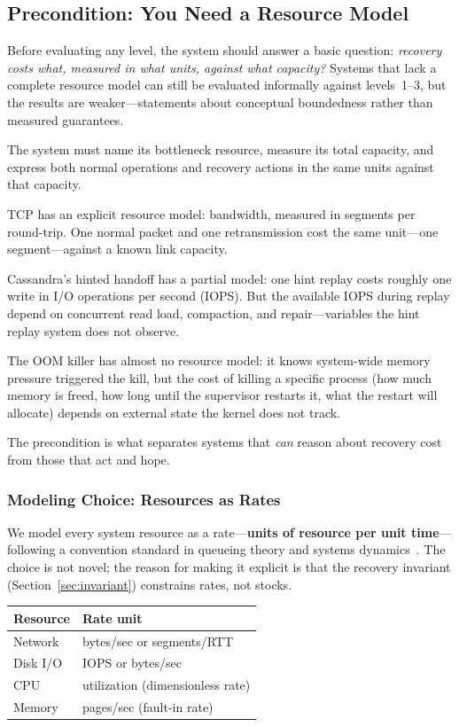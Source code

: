 \documentclass[11pt]{article}
\begin{document}
\subsection{Precondition: You Need a Resource Model}

Before evaluating any level, the system should answer a basic question:
\emph{recovery costs what, measured in what units, against what capacity?}
Systems that lack a complete resource model can still be evaluated informally
against levels~1--3, but the results are weaker---statements about conceptual
boundedness rather than measured guarantees.

The system must name its bottleneck resource, measure its total capacity, and
express both normal operations and recovery actions in the same units against
that capacity.

TCP has an explicit resource model: bandwidth, measured in segments per
round-trip. One normal packet and one retransmission cost the same unit---one
segment---against a known link capacity.

Cassandra's hinted handoff has a partial model: one hint replay costs roughly
one write in I/O operations per second (IOPS). But the available IOPS during
replay depend on concurrent read load, compaction, and repair---variables the
hint replay system does not observe.

The OOM killer has almost no resource model: it knows system-wide memory
pressure triggered the kill, but the cost of killing a specific process (how
much memory is freed, how long until the supervisor restarts it, what the restart
will allocate) depends on external state the kernel does not track.

The precondition is what separates systems that \emph{can} reason about recovery
cost from those that act and hope.

\subsubsection{Modeling Choice: Resources as Rates}
\label{sec:bandwidth}

We model every system resource as a rate---\textbf{units of resource per unit
time}---following a convention standard in queueing theory and systems
dynamics~\cite{forrester1961industrial}. The choice is not novel; the reason
for making it explicit is that the recovery invariant (Section~\ref{sec:invariant})
constrains rates, not stocks.

\begin{center}
\begin{tabular}{@{}ll@{}}
\toprule
Resource & Rate unit \\
\midrule
Network  & bytes/sec or segments/RTT \\
Disk I/O & IOPS or bytes/sec \\
CPU      & utilization (dimensionless rate) \\
Memory   & pages/sec (fault-in rate) \\
\bottomrule
\end{tabular}
\end{center}
\end{document}
